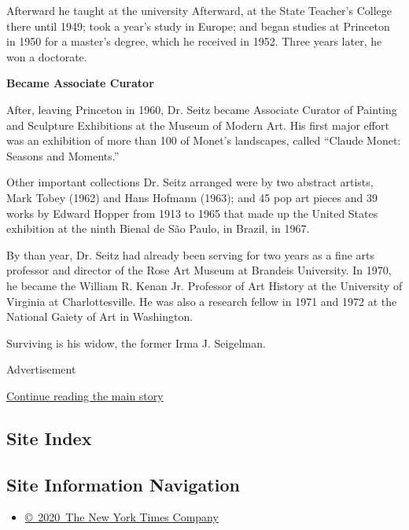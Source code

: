 Afterward he taught at the university Afterward, at the State Teacher's
College there until 1949; took a year's study in Europe; and began
studies at Princeton in 1950 for a master's degree, which he received in
1952. Three years later, he won a doctorate.

\textbf{Became Associate Curator}

After, leaving Princeton in 1960, Dr. Seitz became Associate Curator of
Painting and Sculpture Exhibitions at the Museum of Modern Art. His
first major effort was an exhibition of more than 100 of Monet's
landscapes, called ``Claude Monet: Seasons and Moments.''

Other important collections Dr. Seitz arranged were by two abstract
artists, Mark Tobey (1962) and Hans Hofmann (1963); and 45 pop art
pieces and 39 works by Edward Hopper from 1913 to 1965 that made up the
United States exhibition at the ninth Bienal de São Paulo, in Brazil, in
1967.

By than year, Dr. Seitz had already been serving for two years as a fine
arts professor and director of the Rose Art Museum at Brandeis
University. In 1970, he became the William R. Kenan Jr. Professor of Art
History at the University of Virginia at Charlottesville. He was also a
research fellow in 1971 and 1972 at the National Gaiety of Art in
Washington.

Surviving is his widow, the former Irma J. Seigelman.

Advertisement

\protect\hyperlink{after-bottom}{Continue reading the main story}

\hypertarget{site-index}{%
\subsection{Site Index}\label{site-index}}

\hypertarget{site-information-navigation}{%
\subsection{Site Information
Navigation}\label{site-information-navigation}}

\begin{itemize}
\tightlist
\item
  \href{https://help.nytimes3xbfgragh.onion/hc/en-us/articles/115014792127-Copyright-notice}{©~2020~The
  New York Times Company}
\end{itemize}

